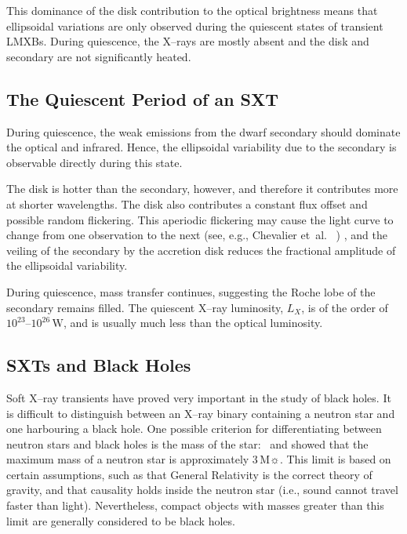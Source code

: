 \vspace{\myparskip}

This dominance of the disk contribution to the optical brightness means
that ellipsoidal variations are only observed during the quiescent
states of transient LMXBs. During
quiescence, the X--rays are mostly absent and the disk and secondary are not
significantly heated. %


\subsection{The Quiescent Period of an SXT}
\label{cha:Introduction:sec:X--rayBinaries:subsec:Quiescence}

During quiescence, the weak emissions from the dwarf secondary should dominate the optical and
infrared. Hence, the ellipsoidal variability due to the secondary is
observable directly during this state. %

\vspace{\myparskip}

The disk is hotter than the secondary, however, and therefore it contributes more at shorter wavelengths.
The disk also contributes a constant flux offset and
possible random flickering. This aperiodic flickering may cause the light curve to change
from one observation to the next (see, e.g., Chevalier et~al.\ %
)%
, and the veiling of the secondary by the accretion disk reduces the
fractional amplitude of the ellipsoidal variability. %

\vspace{\myparskip}

During quiescence, mass transfer continues, suggesting the Roche lobe
of the secondary remains filled. The quiescent X--ray luminosity,
$L_X$, is of the order of $10^{23}$--$10^{26}\,\mathrm{W}$, and is
usually much less than the optical luminosity.


\subsection{SXTs and Black Holes}
\label{cha:Introduction:sec:X--rayBinaries:subsec:BHCSXTs}

Soft X--ray transients have proved very important in the study of
black holes. It is difficult to distinguish between an X--ray binary containing a neutron star and one harbouring a black hole. One possible criterion for differentiating between neutron stars and
black holes is the mass of the star: %
\ and %
showed that the maximum mass of a neutron star is approximately
$3\,\mathrm{M}\sun$. %
This limit is based on certain assumptions, such as that General Relativity
is the correct theory of gravity, and that causality holds inside the
neutron star (i.e., sound cannot travel faster than light). Nevertheless, compact objects with masses greater than this limit are generally considered to be black holes.

